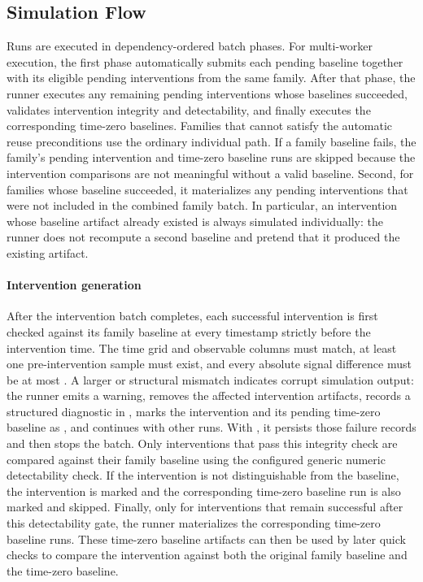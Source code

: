 \documentclass[11pt]{article}
\begin{document}
\subsection*{Simulation Flow}
Runs are executed in dependency-ordered batch phases.
For multi-worker execution, the first phase automatically submits each pending baseline together with its eligible pending interventions from the same family.
After that phase, the runner executes any remaining pending interventions whose baselines succeeded, validates intervention integrity and detectability, and finally executes the corresponding time-zero baselines.
Families that cannot satisfy the automatic reuse preconditions use the ordinary individual path.
If a family baseline fails, the family's pending intervention and time-zero baseline runs are skipped because the intervention comparisons are not meaningful without a valid baseline.
Second, for families whose baseline succeeded, it materializes any pending interventions that were not included in the combined
family batch. In particular, an intervention whose baseline artifact already existed is always simulated individually: the runner
does not recompute a second baseline and pretend that it produced the existing artifact.

\paragraph{Intervention generation}
After the intervention batch completes, each successful intervention is first checked against its family baseline at every timestamp strictly before the intervention time.
The time grid and observable columns must match, at least one pre-intervention sample must exist, and every absolute signal difference must be at most .
A larger or structural mismatch indicates corrupt simulation output: the runner emits a warning, removes the affected intervention artifacts, records a structured diagnostic in , marks the intervention and its pending time-zero baseline as , and continues with other runs.
With , it persists those failure records and then stops the batch.
Only interventions that pass this integrity check are compared against their family baseline using the configured generic numeric detectability check.
If the intervention is not distinguishable from the baseline, the intervention is marked  and the corresponding time-zero baseline run is also marked  and skipped.
Finally, only for interventions that remain successful after this detectability gate, the runner materializes the corresponding time-zero baseline runs.
These time-zero baseline artifacts can then be used by later quick checks to compare the intervention against both the original family baseline and the time-zero baseline.
\end{document}
